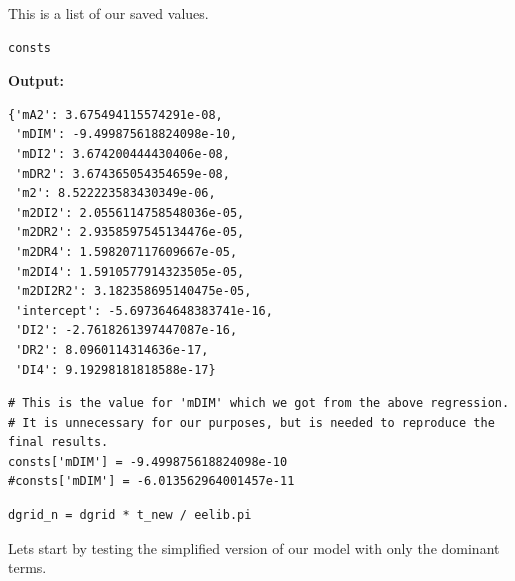 \documentclass{article}
\begin{document}
This is a list of our saved values.

\begin{lstlisting}
consts\end{lstlisting}

\textbf{Output:}\begin{verbatim}
{'mA2': 3.675494115574291e-08,
 'mDIM': -9.499875618824098e-10,
 'mDI2': 3.674200444430406e-08,
 'mDR2': 3.674365054354659e-08,
 'm2': 8.522223583430349e-06,
 'm2DI2': 2.0556114758548036e-05,
 'm2DR2': 2.9358597545134476e-05,
 'm2DR4': 1.598207117609667e-05,
 'm2DI4': 1.5910577914323505e-05,
 'm2DI2R2': 3.182358695140475e-05,
 'intercept': -5.697364648383741e-16,
 'DI2': -2.7618261397447087e-16,
 'DR2': 8.0960114314636e-17,
 'DI4': 9.19298181818588e-17}
\end{verbatim}

\begin{lstlisting}
# This is the value for 'mDIM' which we got from the above regression.
# It is unnecessary for our purposes, but is needed to reproduce the final results.
consts['mDIM'] = -9.499875618824098e-10
#consts['mDIM'] = -6.013562964001457e-11\end{lstlisting}

\begin{lstlisting}
dgrid_n = dgrid * t_new / eelib.pi\end{lstlisting}

Lets start by testing the simplified version of our model with only the dominant terms.
\end{document}
